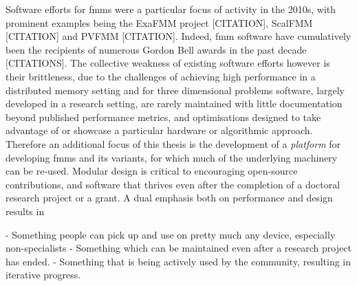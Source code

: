 Software efforts for \acrshort{fmm}s were a particular focus of activity in the 2010s, with prominent examples being the ExaFMM project [CITATION], ScalFMM [CITATION] and PVFMM [CITATION]. Indeed, \acrshort{fmm} software have cumulatively been the recipients of numerous Gordon Bell awards in the past decade [CITATIONS]. The collective weakness of existing software efforts however is their brittleness, due to the challenges of achieving high performance in a distributed memory setting and for three dimensional problems software, largely developed in a research setting, are rarely maintained with little documentation beyond published performance metrics, and optimisations designed to take advantage of or showcase a particular hardware or algorithmic approach. Therefore an additional focus of this thesis is the development of a \textit{platform} for developing \acrshort{fmm}s and its variants, for which much of the underlying machinery can be re-used. Modular design is critical to encouraging open-source contributions, and software that thrives even after the completion of a doctoral research project or a grant. A dual emphasis both on performance and design results in

- Something people can pick up and use on pretty much any device, especially non-specialists
- Something which can be maintained even after a research project has ended.
- Something that is being actively used by the community, resulting in iterative progress.
